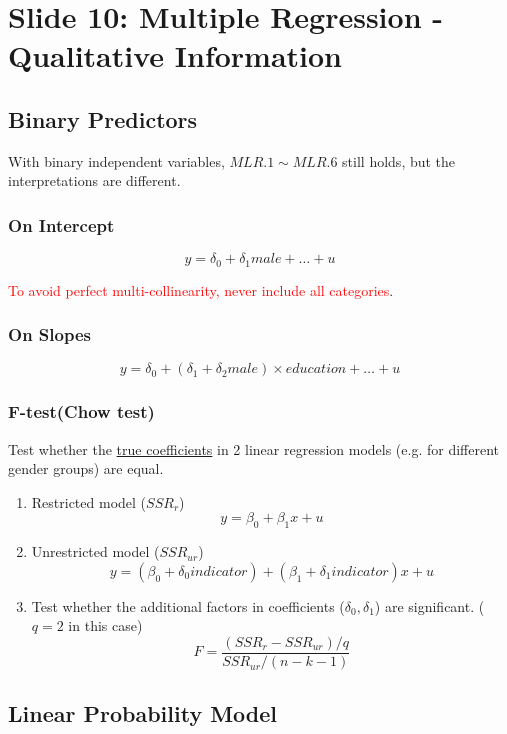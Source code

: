 \documentclass[]{article}
\begin{document}
	\section{Slide 10: Multiple Regression - Qualitative Information}
		\subsection{Binary Predictors}
			\begin{remark}
				With binary independent variables, $MLR.1 \sim MLR.6$ still holds, but the interpretations are different.
			\end{remark}
			
			\subsubsection{On Intercept}
			\[
				y = \delta_0 + \delta_1 male + \dots + u
			\]
			\begin{remark}
				\textcolor{red}{To avoid perfect multi-collinearity, never include all categories}.
			\end{remark}
			
			\subsubsection{On Slopes}
			\[
				y = \delta_0 + (\delta_1 + \delta_2 male)\times education + \dots + u
			\]
			
			\subsubsection{F-test(Chow test)}
			\par Test whether the \ul{true coefficients} in 2 linear regression models (e.g. for different gender groups) are equal. 
			\begin{enumerate}
				\item Restricted model ($SSR_r$) \[y = \beta_0 + \beta_1 x + u \]
				\item Unrestricted model ($SSR_{ur}$) \[y = (\beta_0 + \delta_0 indicator) + (\beta_1 + \delta_1 indicator) x + u\]
				\item Test whether the additional factors in coefficients ($\delta_0, \delta_1$) are significant. ($q=2$ in this case)
				\[
					F = \frac{(SSR_{r} - SSR_{ur})/q}{SSR_{ur}/(n-k-1)}
				\]
			\end{enumerate}
		\subsection{Linear Probability Model}
\end{document}
